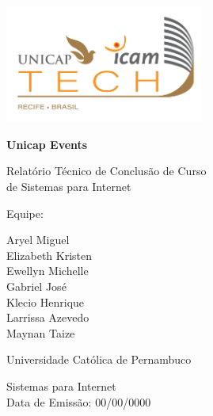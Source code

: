 \documentclass[12pt]{report}
\begin{document}
\newcommand{\titulo}{Unicap Events}
\newcommand{\nombreestudiante}{Aryel Miguel\\Elizabeth Kristen\\Ewellyn Michelle\\Gabriel José\\Klecio Henrique\\Larrissa Azevedo\\Maynan Taize\\}
\newcommand{\fecha}{\date{\today}}


\begin{titlepage}
	\centering
	\includegraphics[width=65mm]{figuras/icamTech.png}\par
	\vspace{1cm}
	{\LARGE\bfseries \titulo \par}
	\vfill
	{\large Relatório Técnico de Conclusão de Curso\\de Sistemas para Internet\par

	\vfill
	Equipe:\par\vspace{2mm}
	\nombreestudiante\par
    \vfill
    Universidade Católica de Pernambuco\par
    Sistemas para Internet \\ Data de Emissão: 00/00/0000
	\date{\today}
 \par}
\end{titlepage}

\tableofcontents
\listoffigures







\printbibliography[heading=bibintoc, title={Referencias}]
\end{document}

